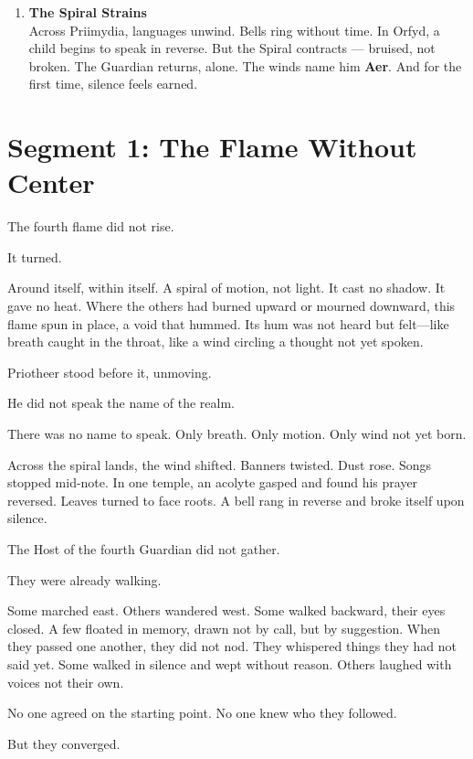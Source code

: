 \documentclass[9pt]{article}
\begin{document}
\begin{center}
\begin{enumerate}
    \vspace{.3in}
    \item \textbf{The Spiral Strains} \\
    Across Priimydia, languages unwind. Bells ring without time. In Orfyd, a child begins to speak in reverse. But the Spiral contracts — bruised, not broken. The Guardian returns, alone. The winds name him \textbf{Aer}. And for the first time, silence feels earned.
\end{enumerate}
\end{center}

\newpage

\section*{Segment 1: The Flame Without Center}

The fourth flame did not rise.

It turned.

Around itself, within itself. A spiral of motion, not light. It cast no shadow. It gave no heat. Where the others had burned upward or mourned downward, this flame spun in place, a void that hummed. Its hum was not heard but felt—like breath caught in the throat, like a wind circling a thought not yet spoken.

Priotheer stood before it, unmoving.

He did not speak the name of the realm.

There was no name to speak. Only breath. Only motion. Only wind not yet born.

Across the spiral lands, the wind shifted. Banners twisted. Dust rose. Songs stopped mid-note. In one temple, an acolyte gasped and found his prayer reversed. Leaves turned to face roots. A bell rang in reverse and broke itself upon silence.

The Host of the fourth Guardian did not gather.

They were already walking.

Some marched east. Others wandered west. Some walked backward, their eyes closed. A few floated in memory, drawn not by call, but by suggestion. When they passed one another, they did not nod. They whispered things they had not said yet. Some walked in silence and wept without reason. Others laughed with voices not their own.

No one agreed on the starting point. No one knew who they followed.

But they converged.
\end{document}
